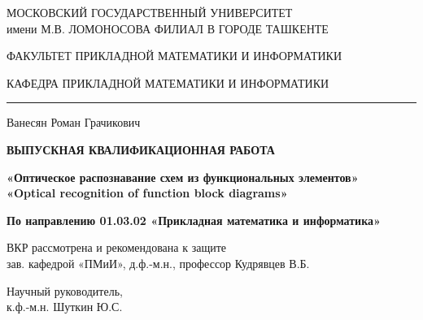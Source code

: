 \documentclass[makeidx, a4paper, 14pt]{extarticle}
\begin{document}
\begin{titlepage}
    \thispagestyle{fancy}
    \renewcommand{\headrulewidth}{0pt}
    \begin{center}
        \begin{small}
            МОСКОВСКИЙ ГОСУДАРСТВЕННЫЙ УНИВЕРСИТЕТ \\
            имени М.В. ЛОМОНОСОВА
            \medskip
            ФИЛИАЛ В ГОРОДЕ ТАШКЕНТЕ

            \bigskip
            \bigskip

            ФАКУЛЬТЕТ ПРИКЛАДНОЙ МАТЕМАТИКИ И ИНФОРМАТИКИ \\

            \medskip

            КАФЕДРА ПРИКЛАДНОЙ МАТЕМАТИКИ И ИНФОРМАТИКИ
        \end{small}

        \bigskip
        \hrule

        \bigskip
        \bigskip
        \bigskip

        \large{Ванесян Роман Грачикович}

        \bigskip
        \bigskip

        \textbf{ВЫПУСКНАЯ КВАЛИФИКАЦИОННАЯ РАБОТА}

        \bigskip
        \bigskip

        \textbf{«Оптическое распознавание схем из функциональных элементов»} \\
        \textbf{«Optical recognition of function block diagrams»}
        \bigskip
        \bigskip

        \small{\textbf{По направлению 01.03.02 «Прикладная математика и информатика»}}

        \bigskip
        \bigskip
        \bigskip
        \bigskip
        \bigskip
        \bigskip

        \begin{small}
            \begin{flushleft}
                ВКР рассмотрена и рекомендована к защите  \\
                зав. кафедрой «ПМиИ», д.ф.-м.н., профессор \underline{\hspace{2.9cm}} Кудрявцев В.Б.
            \end{flushleft}

            
            \begin{flushleft}
                Научный руководитель, \\
                к.ф.-м.н. \underline{\hspace{10cm}} Шуткин Ю.С.
            \end{flushleft}


\end{small}
\end{center}
\end{titlepage}
\end{document}
